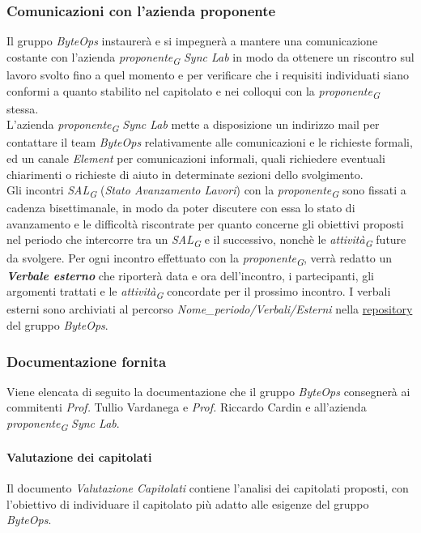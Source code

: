 \subsubsection{Comunicazioni con l'azienda proponente}
Il gruppo \textit{ByteOps} instaurerà e si impegnerà a mantere una comunicazione costante con l'azienda \textit{proponente}\textsubscript{\textit{G}} \textit{Sync Lab} in modo da ottenere un riscontro sul lavoro svolto fino a quel momento e per verificare che i requisiti individuati siano conformi a quanto stabilito nel capitolato e nei colloqui con la \textit{proponente}\textsubscript{\textit{G}} stessa.\\
L'azienda \textit{proponente}\textsubscript{\textit{G}} \textit{Sync Lab} mette a disposizione un indirizzo mail per contattare il team \textit{ByteOps} relativamente alle comunicazioni e le richieste formali, ed un canale \textit{Element} per comunicazioni informali, quali richiedere eventuali chiarimenti o richieste di aiuto in determinate sezioni dello svolgimento.\\
Gli incontri \textit{SAL}\textsubscript{\textit{G}} (\textit{Stato Avanzamento Lavori}) con la \textit{proponente}\textsubscript{\textit{G}} sono fissati a cadenza bisettimanale, in modo da poter discutere con essa lo stato di avanzamento e le difficoltà riscontrate per quanto concerne gli obiettivi proposti nel periodo che intercorre tra un \textit{SAL}\textsubscript{\textit{G}} e il successivo, nonchè le \textit{attività}\textsubscript{\textit{G}} future da svolgere.
Per ogni incontro effettuato con la \textit{proponente}\textsubscript{\textit{G}}, verrà redatto un \textit{\textbf{Verbale esterno}} che riporterà data e ora dell'incontro, i partecipanti, gli argomenti trattati e le \textit{attività}\textsubscript{\textit{G}} concordate per il prossimo incontro.
I verbali esterni sono archiviati al percorso \textit{Nome\_periodo/Verbali/Esterni} nella \href{https://github.com/ByteOps-swe/Documents}{repository} del gruppo \textit{ByteOps}.

\subsubsection {Documentazione fornita}
Viene elencata di seguito la documentazione che il gruppo \textit{ByteOps} consegnerà ai commitenti \textit{Prof.} Tullio Vardanega e \textit{Prof.} Riccardo Cardin e all'azienda \textit{proponente}\textsubscript{\textit{G}} \textit{Sync Lab}.

\paragraph{Valutazione dei capitolati}
Il documento \textit{Valutazione Capitolati} contiene l'analisi dei capitolati proposti, con l'obiettivo di individuare il capitolato più adatto alle esigenze del gruppo \textit{ByteOps}. 

